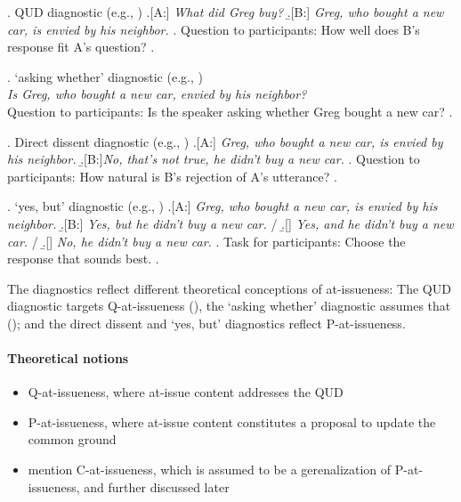 \documentclass[12pt]{article}
\begin{document}
    \ex. \label{qud}%
      QUD diagnostic (e.g., \citealt{tonhauser_diagnosing_2012,chen_presuppositions_2024})
      \a.[A:] \emph{What did Greg buy?}
      \b.[B:] \emph{Greg, who bought a new car, is envied by his neighbor.}
      \z.
      Question to participants: How well does B's response fit A's question?
    \z.

    \ex. \label{aw}%
      `asking whether' diagnostic (e.g., \citealt{tonhauser_how_2018,solstad_cataphoric_2024})\smallskip\\
        \emph{Is Greg, who bought a new car, envied by his neighbor?}\smallskip
    \\ Question to participants: Is the speaker asking whether Greg bought a new car?
    \z.

    \ex. \label{dd} Direct dissent diagnostic (e.g., \citealt{tonhauser_diagnosing_2012,syrett_experimental_2015})
      \a.[A:] \emph{Greg, who bought a new car, is envied by his neighbor.}
      \b.[B:]\emph{No, that's not true, he didn't buy a new car.}
      \z.
    Question to participants: How natural is B's rejection of A's utterance?
    \z.

    \ex. \label{yesbut}%
      `yes, but' diagnostic (e.g., \citealt{xue_correlation_2011,schwarz_cross-linguistic_2015})
      \a.[A:] \emph{Greg, who bought a new car, is envied by his neighbor.}
      \b.[B:] \emph{Yes, but he didn't buy a new car.} /
      \b.[] \emph{Yes, and he didn't buy a new car.} /
      \b.[] \emph{No, he didn't buy a new car.}
      \z.
      Task for participants: Choose the response that sounds best.
    \z.

    The diagnostics reflect different theoretical conceptions of at-issueness: The QUD diagnostic targets Q-at-issueness (\citealt{koev_notions_2018}), the `asking whether' diagnostic assumes that  (\citealt{tonhauser_how_2018}); and the direct dissent and `yes, but' diagnostics reflect P-at-issueness.
   

  \paragraph{Theoretical notions}
    \citealt{koev_notions_2018}
    \begin{itemize}
      \item  Q-at-issueness, where at-issue content addresses the QUD
      \item P-at-issueness, where at-issue content constitutes a proposal to update the common ground
      \item mention C-at-issueness, which is assumed to be a gerenalization of P-at-issueness, and further discussed later
    \end{itemize}
\end{document}
